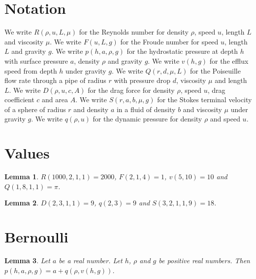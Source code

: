 \documentclass{article}
\newtheorem{lemma}{Lemma}
\begin{document}
\section{Notation}

We write $R(\rho,u,L,\mu)$ for the Reynolds number for density $\rho$, speed $u$, length $L$ and viscosity $\mu$.
We write $F(u,L,g)$ for the Froude number for speed $u$, length $L$ and gravity $g$.
We write $p(h,a,\rho,g)$ for the hydrostatic pressure at depth $h$ with surface pressure $a$, density $\rho$ and gravity $g$.
We write $v(h,g)$ for the efflux speed from depth $h$ under gravity $g$.
We write $Q(r,d,\mu,L)$ for the Poiseuille flow rate through a pipe of radius $r$ with pressure drop $d$, viscosity $\mu$ and length $L$.
We write $D(\rho,u,c,A)$ for the drag force for density $\rho$, speed $u$, drag coefficient $c$ and area $A$.
We write $S(r,a,b,\mu,g)$ for the Stokes terminal velocity of a sphere of radius $r$ and density $a$ in a fluid of density $b$ and viscosity $\mu$ under gravity $g$.
We write $q(\rho,u)$ for the dynamic pressure for density $\rho$ and speed $u$.

\section{Values}

\begin{lemma}\label{values}
$R(1000,2,1,1)=2000$, $F(2,1,4)=1$, $v(5,10)=10$ and $Q(1,8,1,1)=\pi$.
\end{lemma}

\begin{lemma}\label{forces}
$D(2,3,1,1)=9$, $q(2,3)=9$ and $S(3,2,1,1,9)=18$.
\end{lemma}

\section{Bernoulli}

\begin{lemma}\label{bernoulli}
Let $a$ be a real number. Let $h$, $\rho$ and $g$ be positive real numbers. Then $p(h,a,\rho,g)=a+q(\rho,v(h,g))$.
\end{lemma}
\end{document}
